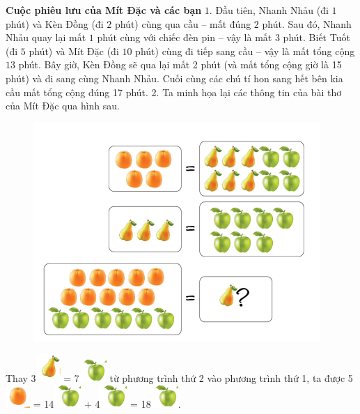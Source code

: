 \textbf{Cuộc phiêu lưu của Mít Đặc và các bạn}
\vskip 0.1cm
$1.$ Đầu tiên, Nhanh Nhảu (đi $1$ phút) và Kèn Đồng (đi $2$ phút) cùng qua cầu -- mất đúng $2$ phút. Sau đó, Nhanh Nhảu quay lại mất $1$ phút cùng với chiếc đèn pin -- vậy là mất $3$ phút. Biết Tuốt (đi $5$ phút) và Mít Đặc (đi $10$ phút) cùng đi tiếp sang cầu -- vậy là mất tổng cộng $13$ phút. Bây giờ, Kèn Đồng sẽ qua lại mất 2 phút (và mất tổng cộng giờ là 15 phút) và đi sang cùng Nhanh Nhảu. Cuối cùng các chú tí hon sang hết bên kia cầu mất tổng cộng đúng 17 phút.
\vskip 0.1cm
2. Ta minh họa lại các thông tin của bài thơ của Mít Đặc qua hình sau.
\begin{figure}[H]
	\centering
	\vspace*{-5pt}
	\captionsetup{labelformat= empty, justification=centering}
	\includegraphics[width=0.5\linewidth]{3}
	\vspace*{-15pt}
\end{figure}
Thay $3$\includegraphics{4}  = 7\includegraphics{5} từ phương trình thứ 2 vào phương trình thứ 1, ta được
\vskip 0.1cm
5\includegraphics{6}  = 14\includegraphics{5}  + 4\includegraphics{5}  = 18\includegraphics{5}.
